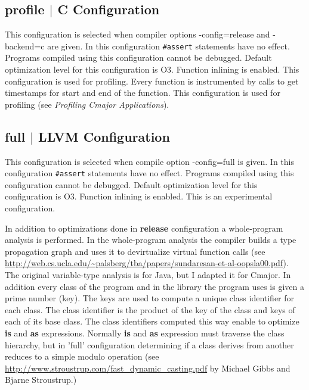 \documentclass[oneside, a4paper, 11pt]{article}
\begin{document}
\subsection{profile $|$ C Configuration}

This configuration is selected when compiler options -config=release and -backend=c are given. In this configuration \verb|#assert| statements have no effect.
Programs compiled using this configuration cannot be debugged. Default optimization level for this configuration is O3. Function inlining is enabled.
This configuration is used for profiling. Every function is instrumented by calls to get timestamps for start and end of the function.
This configuration is used for profiling (see \emph{Profiling Cmajor Applications}).

\subsection{full $|$ LLVM Configuration}

This configuration is selected when compile option -config=full is given. In this configuration \verb|#assert| statements have no effect.
Programs compiled using this configuration cannot be debugged. Default optimization level for this configuration is O3. Function inlining is enabled.
This is an experimental configuration.

In addition to optimizations done in \textbf{release} configuration a whole-program analysis is performed.
In the whole-program analysis the compiler builds a type propagation graph and uses it to devirtualize
virtual function calls (see \url{http://web.cs.ucla.edu/~palsberg/tba/papers/sundaresan-et-al-oopsla00.pdf}).
The original variable-type analysis is for Java, but I adapted it for Cmajor.
In addition every class of the program and in the library the program uses is given a prime number (key). The keys are used to compute a unique class identifier
for each class. The class identifier is the product of the key of the class and keys of each of its base class.
The class identifiers computed this way enable to optimize \textbf{is} and \textbf{as} expressions.
Normally \textbf{is} and \textbf{as} expression must traverse the class hierarchy,
but in 'full' configuration determining if a class derives from another reduces to a simple modulo operation
(see \url{http://www.stroustrup.com/fast_dynamic_casting.pdf} by Michael Gibbs and Bjarne Stroustrup.)
\end{document}
